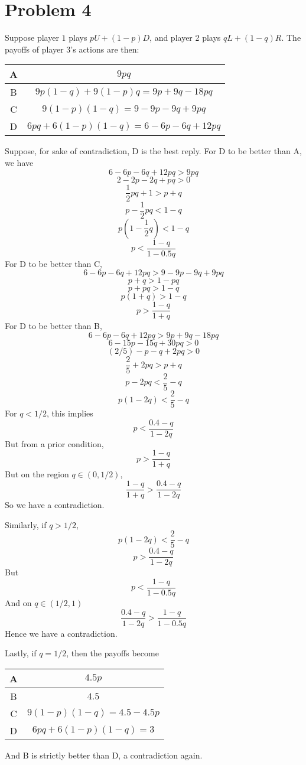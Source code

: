 \documentclass[10pt,letter]{article}
\begin{document}
\section*{Problem 4}
Suppose player $1$ plays $pU + (1-p)D$, and player 2 plays $qL + (1-q)R$. The payoffs of player 3's actions are then:
\begin{center}
\begin{tabular}{  c | c  }
 A & $ 9pq $ \\ \hline
 B & $ 9p(1-q) + 9(1-p)q = 9p + 9q - 18pq$ \\ \hline
 C & $ 9(1-p)(1-q) = 9 - 9p - 9q + 9pq$ \\ \hline
 D & $ 6pq + 6(1-p)(1-q) = 6 - 6p - 6q + 12pq$
\end{tabular}
\end{center}
Suppose, for sake of contradiction, D is the best reply. For D to be better than A, we have
\[ 6 - 6p - 6q + 12pq > 9pq \]
\[ 2 - 2p - 2q + pq > 0 \]
\[ \frac{1}{2}pq + 1 > p + q \]
\[ p - \frac{1}{2}pq  < 1 - q \]
\[ p\left(1 - \frac{1}{2}q \right) < 1 - q \]
\[ p < \frac{1-q}{1 - 0.5q} \]
For D to be better than C,
\[ 6 - 6p - 6q + 12pq > 9 - 9p - 9q + 9pq \]
\[ p + q > 1 - pq \]
\[ p + pq > 1 - q \]
\[ p(1+q) > 1-q \]
\[ p > \frac{1-q}{1+q} \]
For D to be better than B,
\[ 6 - 6p - 6q + 12pq > 9p + 9q - 18pq \]
\[ 6 - 15p - 15q + 30pq > 0 \]
\[ (2/5) - p - q + 2pq > 0 \]
\[ \frac{2}{5} + 2pq > p + q \]
\[ p - 2pq < \frac{2}{5} - q \]
\[ p(1-2q) < \frac{2}{5} - q \]
For $q < 1/2$, this implies
\[ p < \frac{0.4 - q}{1 - 2q}\]
But from a prior condition,
\[ p > \frac{1-q}{1+q} \]
But on the region $q \in (0, 1/2)$,
\[ \frac{1-q}{1+q} > \frac{0.4 - q}{1 - 2q} \]
So we have a contradiction.

Similarly, if $q > 1/2$,
\[ p(1-2q) < \frac{2}{5} - q  \]
\[ p > \frac{0.4 - q}{1 - 2q} \]
But
\[ p < \frac{1-q}{1 - 0.5q} \]
And on $q \in (1/2, 1)$
\[ \frac{0.4 - q}{1 - 2q}  >  \frac{1-q}{1 - 0.5q} \]
Hence we have a contradiction.

Lastly, if $q = 1/2$, then the payoffs become
\begin{center}
\begin{tabular}{  c | c  }
 A & $ 4.5p $ \\ \hline
 B & $ 4.5 $ \\ \hline
 C & $ 9(1-p)(1-q) = 4.5 - 4.5p$ \\ \hline
 D & $ 6pq + 6(1-p)(1-q) = 3$
\end{tabular}
And B is strictly better than D, a contradiction again.
\end{center}
\end{document}
